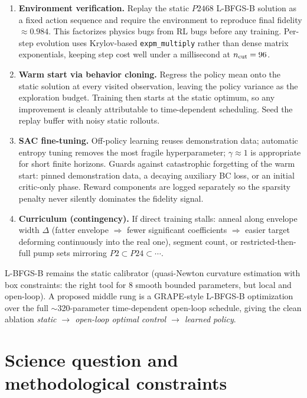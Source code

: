 \documentclass[11pt]{article}
\begin{document}
\begin{enumerate}
  \item[\textbf{Stage 0.}] \textbf{Environment verification.} Replay the static $P2468$ L-BFGS-B solution as a fixed action sequence and require the environment to reproduce final fidelity $\approx 0.984$. This factorizes physics bugs from RL bugs before any training. Per-step evolution uses Krylov-based \texttt{expm\_multiply} rather than dense matrix exponentials, keeping step cost well under a millisecond at $n_{\rm cut}=96$.
  \item[\textbf{Stage 1.}] \textbf{Warm start via behavior cloning.} Regress the policy mean onto the static solution at every visited observation, leaving the policy variance as the exploration budget. Training then starts at the static optimum, so any improvement is cleanly attributable to time-dependent scheduling. Seed the replay buffer with noisy static rollouts.
  \item[\textbf{Stage 2.}] \textbf{SAC fine-tuning.} Off-policy learning reuses demonstration data; automatic entropy tuning removes the most fragile hyperparameter; $\gamma \approx 1$ is appropriate for short finite horizons. Guards against catastrophic forgetting of the warm start: pinned demonstration data, a decaying auxiliary BC loss, or an initial critic-only phase. Reward components are logged separately so the sparsity penalty never silently dominates the fidelity signal.
  \item[\textbf{Stage 3.}] \textbf{Curriculum (contingency).} If direct training stalls: anneal along envelope width $\Delta$ (fatter envelope $\Rightarrow$ fewer significant coefficients $\Rightarrow$ easier target deforming continuously into the real one), segment count, or restricted-then-full pump sets mirroring $P2 \subset P24 \subset \cdots$.
\end{enumerate}

L-BFGS-B remains the static calibrator (quasi-Newton curvature estimation with box constraints: the right tool for 8 smooth bounded parameters, but local and open-loop). A proposed middle rung is a GRAPE-style L-BFGS-B optimization over the full $\sim$320-parameter time-dependent open-loop schedule, giving the clean ablation \emph{static $\to$ open-loop optimal control $\to$ learned policy}.

\section{Science question and methodological constraints}
\end{document}
